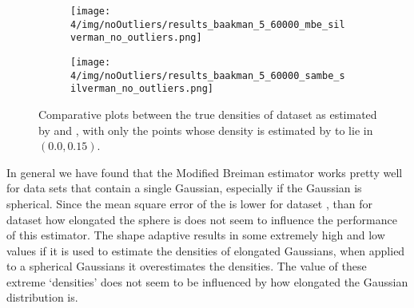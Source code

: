 	\begin{figure}
		\centering
		\begin{subfigure}{0.6\columnwidth}
			\centering
			\texttt{[image: 4/img/noOutliers/results\_baakman\_5\_60000\_mbe\_silverman\_no\_outliers.png]}
			\caption{\mbe}
			\label{fig:results:baakman5:noOutliers:mbe}
		\end{subfigure}
		\begin{subfigure}{0.6\columnwidth}
			\centering
			\texttt{[image: 4/img/noOutliers/results\_baakman\_5\_60000\_sambe\_silverman\_no\_outliers.png]}
			\caption{\sambe}
			\label{fig:results:baakman5:noOUtliers:sambe}
		\end{subfigure}	
		\caption{Comparative plots between the true densities of dataset \baakmanFiveNum as estimated by  \mbe and  \sambe, with only the points whose density is estimated by \sambe to lie in $\left(\num{0.0}, \num{0.15} \right)$.}
		\label{fig:results:baakman5:noOutliers}
	\end{figure}

	In general we have found that the Modified Breiman estimator works pretty well for data sets that contain a single Gaussian, especially if the Gaussian is spherical. Since the mean square error of the \mbe is lower for dataset \baakmanFive, than for dataset \baakmanFour how elongated the sphere is does not seem to influence the performance of this estimator. 
	The shape adaptive \mbe results in some extremely high and low values if it is used to estimate the densities of elongated Gaussians, when applied to a spherical Gaussians it overestimates the densities. The value of these extreme `densities' does not seem to be influenced by how elongated the Gaussian distribution is. 
